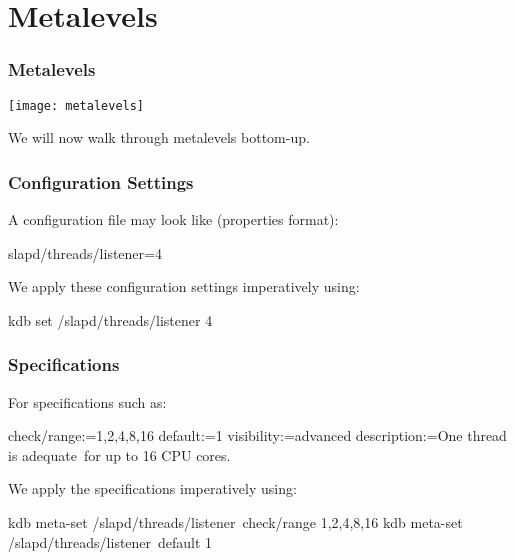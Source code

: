 \section{Metalevels}

\begin{frame}
	\frametitle{Metalevels}
	\texttt{[image: metalevels]}

	We will now walk through metalevels bottom-up.
\end{frame}

\begin{frame}[fragile]
	\frametitle{Configuration Settings}

	A configuration file may look like (properties format):

	\begin{code}[language=CfgElektra]
	slapd/threads/listener=4
	\end{code}

	\vspace{1cm}

	We apply these configuration settings imperatively using:

	\begin{code}[language=bash]
	kdb set /slapd/threads/listener 4
	\end{code}
\end{frame}

\begin{frame}[fragile]
	\frametitle{Specifications}
	For specifications such as:

	\begin{code}
	  check/range:=1,2,4,8,16
	  default:=1
	  visibility:=advanced
	  description:=One thread is adequate\
		       for up to 16 CPU cores.
	\end{code}

	\vspace{0.6cm}

	We apply the specifications imperatively using:

	\begin{code}[language=bash,morekeywords={meta-set}]
	kdb meta-set /slapd/threads/listener\
		check/range 1,2,4,8,16
	kdb meta-set /slapd/threads/listener\
		default 1
	\end{code}
\end{frame}


